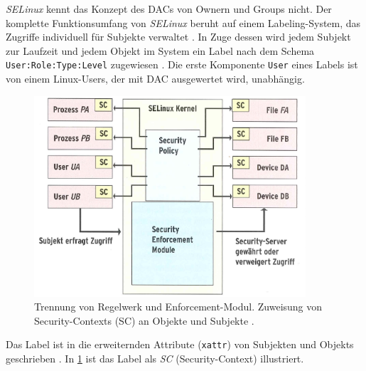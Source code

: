 \documentclass[../main.tex]{subfiles}
\begin{document}
				\emph{SELinux} kennt das Konzept des DACs von Ownern und Groups nicht. Der komplette Funktionsumfang von \emph{SELinux} beruht auf einem Labeling-System, das Zugriffe individuell für Subjekte verwaltet \cite{SELinuxComic}. In Zuge dessen wird jedem Subjekt zur Laufzeit und jedem Objekt im System ein Label nach dem Schema \texttt{User:Role:Type:Level} zugewiesen \cite{atomicDockerSELinux}. Die erste Komponente \texttt{User} eines Labels ist von einem Linux-Users, der mit \acrshort{DAC} ausgewertet wird, unabhängig.

				\begin{figure}[h]
						\centering
						\includegraphics[width=0.9\textwidth]{./images/sec_SELinux.jpg}
						\caption{Trennung von Regelwerk und Enforcement-Modul. Zuweisung von Security-Contexts (SC) an Objekte und Subjekte \cite[S.63]{linuxMagazineSec}.}
						\label{fig:sec_SELinux}
				\end{figure}

				Das Label ist in die erweiternden Attribute (\texttt{xattr}) von Subjekten und Objekts geschrieben \cite[S.65]{linuxMagazineSec}. In \fig \ref{fig:sec_SELinux} ist das Label als \emph{SC} (Security-Context) illustriert.

\end{document}

